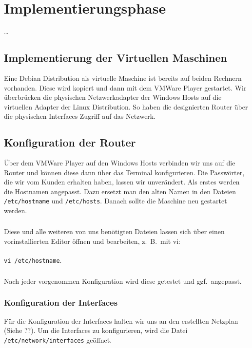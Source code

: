\section{Implementierungsphase} 
\label{sec:Implementierungsphase}

\dots


\subsection{Implementierung der Virtuellen Maschinen}
\label{subsec:ImplementierungVMs}
Eine Debian Distribution als virtuelle Maschine ist bereits auf beiden Rechnern vorhanden. Diese wird kopiert und dann mit dem VMWare Player gestartet. Wir überbrücken die physischen Netzwerkadapter der Windows Hosts auf die virtuellen Adapter der Linux Distribution. So haben die designierten Router über die physischen Interfaces Zugriff auf das Netzwerk. 


\subsection{Konfiguration der Router}
\label{subsec:KonfigurationRouter}

Über dem VMWare Player auf den Windows Hosts verbinden wir uns auf die Router und können diese dann über das Terminal konfigurieren. Die Passwörter, die wir vom Kunden erhalten haben, lassen wir unverändert. Als erstes werden die Hostnamen angepasst. Dazu ersetzt man den alten Namen in den Dateien \texttt{/etc/hostname} und \texttt{/etc/hosts}. Danach sollte die Maschine neu gestartet werden.
\subparagraph*{} Diese und alle weiteren von uns benötigten Dateien lassen sich über einen vorinstallierten Editor öffnen und bearbeiten, z.\ B.\ mit vi:\\\\
\noindent\hspace*{42mm} \texttt{vi /etc/hostname}.
\subparagraph*{} Nach jeder vorgenommen Konfiguration wird diese getestet und ggf.\ angepasst.

\subsubsection{Konfiguration der Interfaces}
\label{subsubsec:KonfigurationInsideRouterInt}
Für die Konfiguration der Interfaces halten wir uns an den erstellten Netzplan (Siehe ??).
Um die Interfaces zu konfigurieren, wird die Datei \texttt{/etc/network/interfaces} geöffnet.

